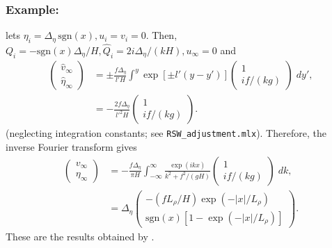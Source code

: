 \documentclass[10pt,reqno]{amsart}
\newcommand{\sign}{\mathrm{sgn}}
\begin{document}
\subsubsection*{Example:} \citet{gill76,gill82} lets $\eta_i = \Delta_\eta \, \sign (x), u_i = v_i = 0$.
Then, $Q_i = -\sign (x) \Delta_\eta / H, \hat{Q}_i = 2 i \Delta_\eta / (k H), u_{\infty} = 0$ and
\begin{align}
\begin{pmatrix}
\hat{v}_{\infty} \\
\hat{\eta}_{\infty}
\end{pmatrix} & = \pm \frac{f \Delta_\eta}{ l' H}  \int^y \exp \left[ \pm l'\left( y - y' \right) \right]
 \begin{pmatrix}
1\\
i f / (k  g) \end{pmatrix} 
  \; d y' ,   \\
  & = - \frac{2 f \Delta_\eta}{ l'^2 H} 
 \begin{pmatrix}
1\\
i f / (k  g) \end{pmatrix} .   
\label{eq:inf_plane_steady_soln}
\end{align}
(neglecting integration constants; see \texttt{RSW\_adjustment.mlx}).
Therefore, the inverse Fourier transform gives
\begin{align}
\begin{pmatrix}
v_{\infty} \\
\eta_{\infty}
\end{pmatrix} & = - \frac{ f \Delta_\eta}{\pi H} 
\int_{- \infty}^{\infty} \frac{\exp ( i k x ) }{k^2 + f^2/(gH)}
 \begin{pmatrix}
1\\
i f / (k  g) \end{pmatrix} \; dk ,   \\
& = \Delta_\eta \begin{pmatrix}
- (f L_\rho /H) \exp \left( - |x| / L_\rho \right) \\
\sign (x) \left[ 1 - \exp \left( - |x| / L_\rho \right)\right]  
 \end{pmatrix}  .   
\end{align}
These are the results obtained by \citet{gill76,gill82}.
\end{document}

